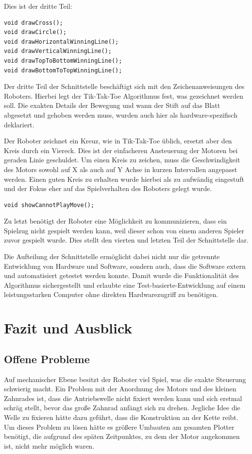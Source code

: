 \documentclass[conference,compsoc,final,a4paper]{IEEEtran}
\begin{document}
Dies ist der dritte Teil:

\begin{verbatim}
void drawCross();
void drawCircle();
void drawHorizontalWinningLine();
void drawVerticalWinningLine();
void drawTopToBottomWinningLine();
void drawBottomToTopWinningLine();
\end{verbatim}

Der dritte Teil der Schnittstelle beschäftigt sich mit den Zeichenanweisungen des Roboters. Hierbei legt der
Tik-Tak-Toe Algorithmus fest, was gezeichnet werden soll. Die exakten Details der Bewegung und wann der Stift
auf das Blatt abgesetzt und gehoben werden muss, wurden auch hier als hardware-spezifisch deklariert.

Der Roboter zeichnet ein Kreuz, wie in Tik-Tak-Toe üblich, ersetzt aber den Kreis durch ein Viereck. Dies ist
der einfacheren Ansteuerung der Motoren bei geraden Linie geschuldet. Um einen Kreis zu zeichen, muss die
Geschwindigkeit des Motors sowohl auf X als auch auf Y Achse in kurzen Intervallen angepasst werden. Einen 
guten Kreis zu erhalten wurde hierbei als zu aufwändig eingestuft und der Fokus eher auf das Spielverhalten
des Roboters gelegt wurde.

\begin{verbatim}
void showCannotPlayMove();
\end{verbatim}

Zu letzt benötigt der Roboter eine Möglichkeit zu kommunizieren, dass ein Spielzug nicht gespielt werden kann,
weil dieser schon von einem anderen Spieler zuvor gespielt wurde. Dies stellt den vierten und letzten Teil der
Schnittstelle dar.

Die Aufteilung der Schnittstelle ermöglicht dabei nicht nur die getrennte Entwicklung von Hardware und Software,
sondern auch, dass die Software extern und automatisiert getestet werden konnte. Damit wurde die Funktionalität des Algorithmus
sichergestellt und erlaubte eine Test-basierte-Entwicklung auf einem leistungsstarken Computer ohne direkten
Hardwarezugriff zu benötigen.

\section{Fazit und Ausblick}

\subsection{Offene Probleme}

Auf mechanischer Ebene besitzt der Roboter viel Spiel, was die exakte Steuerung schwierig macht. Ein Problem mit der Anordnung
des Motors und des kleinen Zahnrades ist, dass die
Antriebswelle nicht fixiert werden kann und sich erstmal schräg stellt, bevor das große Zahnrad anfängt sich zu drehen. Jegliche
Idee die Welle zu fixieren hätte dazu geführt, dass die Konstruktion an der Kette reibt. Um dieses Problem zu lösen hätte es größere
Umbauten am gesamten Plotter benötigt, die aufgrund des späten Zeitpunktes, zu dem der Motor angekommen ist, nicht mehr möglich waren.
\end{document}
